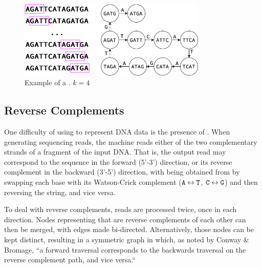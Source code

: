 \begin{figure}[htbp]
	\begin{center}
    \includegraphics[width=0.8\textwidth]{figures/dbg-example}
	\end{center}
	\caption{Example of a \dBG. $k=4$}\label{fig:dbgexample}
\end{figure}

\subsection{Reverse Complements}

One difficulty of using \dBG to represent DNA data is the presence of . When generating sequencing reads, the machine reads either of the two complementary strands of a fragment of the input DNA. That is, the output read may correspond to the sequence  in the forward (5'-3') direction, or its reverse complement  in the backward (3'-5') direction, with
 being obtained from  by swapping each base with its Watson-Crick complement
($\mathtt{A} \leftrightarrow \mathtt{T}$, $\mathtt{C} \leftrightarrow \mathtt{G}$) and then reversing the string, and vice versa. 


To deal with reverse complements, reads are processed twice, once in each direction. Nodes representing  that are reverse complements of each other can then be merged, with edges made bi-directed. Alternatively, those nodes can be kept distinct, resulting in a symmetric graph in which, as noted by Conway \& Bromage, ``a forward traversal corresponds to the backwards traversal on the reverse complement path, and vice versa.``\cite{Conway2011}


